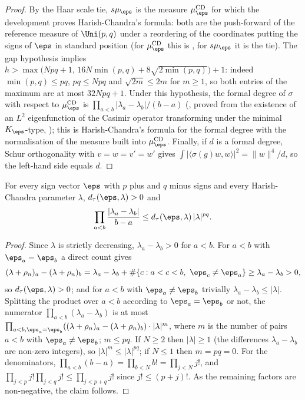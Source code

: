 \begin{proof}
By the Haar scale tie, $s\mu_\eps$ is the measure $\mu^{\mathrm{CD}}_\eps$ for which the development proves
Harish-Chandra's formula: both are the push-forward of the reference measure of $\Uni(p,q)$ under a reordering of the
coordinates putting the signs of $\eps$ in standard position (for $\mu^{\mathrm{CD}}_\eps$ this is
, for $s\mu_\eps$ it is the tie). The gap hypothesis implies
$h>\max\bigl(Npq+1,\,16N\min(p,q)+8\sqrt{2\min(p,q)}\bigr)+1$: indeed $\min(p,q)\le pq$, $pq\le Npq$ and
$\sqrt{2m}\le2m$ for $m\ge1$, so both entries of the maximum are at most $32Npq+1$. Under this hypothesis, the formal
degree of $\sigma$ with respect to $\mu^{\mathrm{CD}}_\eps$ is $\prod_{a<b}|\lambda_a-\lambda_b|/(b-a)$
(, proved from the existence of an $L^2$ eigenfunction of the
Casimir operator transforming under the minimal $K_\eps$-type,
); this is Harish-Chandra's formula for the formal
degree \cite{HarishChandra1966} with the normalisation of the measure built into $\mu^{\mathrm{CD}}_\eps$. Finally, if
$d$ is a formal degree, Schur orthogonality with $v=w=v'=w'$ gives $\int|\langle\sigma(g)w,w\rangle|^2=\|w\|^4/d$, so the
left-hand side equals $d$.
\end{proof}

\begin{lemma}\label{pf:sh-curv:fdegle}
For every sign vector $\eps$ with $p$ plus and $q$ minus signs and every Harish-Chandra parameter $\lambda$,
$\shcurvDt(\eps,\lambda)>0$ and
\[
\prod_{a<b}\frac{|\lambda_a-\lambda_b|}{b-a}\le\shcurvDt(\eps,\lambda)\,|\lambda|^{pq}.
\]
\end{lemma}

\begin{proof}
Since $\lambda$ is strictly decreasing, $\lambda_a-\lambda_b>0$ for $a<b$. For $a<b$ with $\eps_a=\eps_b$ a direct count
gives
\[
(\lambda+\rho_n)_a-(\lambda+\rho_n)_b=\lambda_a-\lambda_b+\#\{c:a<c<b,\ \eps_c\ne\eps_a\}\ge\lambda_a-\lambda_b>0,
\]
so $\shcurvDt(\eps,\lambda)>0$; and for $a<b$ with $\eps_a\ne\eps_b$ trivially $\lambda_a-\lambda_b\le|\lambda|$. Splitting the product over $a<b$ according
to $\eps_a=\eps_b$ or not, the numerator $\prod_{a<b}(\lambda_a-\lambda_b)$ is at most
$\prod_{a<b,\eps_a=\eps_b}((\lambda+\rho_n)_a-(\lambda+\rho_n)_b)\cdot|\lambda|^{m}$, where $m$ is the number of pairs $a<b$
with $\eps_a\ne\eps_b$; $m\le pq$. If $N\ge2$ then $|\lambda|\ge1$ (the differences $\lambda_a-\lambda_b$ are non-zero
integers), so $|\lambda|^m\le|\lambda|^{pq}$; if $N\le1$ then $m=pq=0$. For the denominators,
$\prod_{a<b}(b-a)=\prod_{b<N}b!=\prod_{j<N}j!$, and $\prod_{j<p}j!\prod_{j<q}j!\le\prod_{j<p+q}j!$ since
$j!\le(p+j)!$. As the remaining factors are non-negative, the claim follows.
\end{proof}

